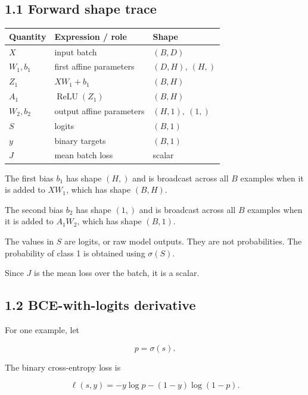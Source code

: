 \documentclass[11pt]{article}
\begin{document}
\subsection*{1.1 Forward shape trace}
\begin{center}

  \begin{tabular}{lll}
    \toprule
    Quantity & Expression / role & Shape \\
    \midrule
    $X$ & input batch & $(B,D)$ \\
    $W_1,b_1$ & first affine parameters & $(D,H),\ (H,)$ \\
    $Z_1$ & $XW_1+b_1$ & $(B,H)$ \\
    $A_1$ & $\operatorname{ReLU}(Z_1)$ & $(B,H)$ \\
    $W_2,b_2$ & output affine parameters & $(H,1),\ (1,)$ \\
    $S$ & logits & $(B,1)$ \\
    $y$ & binary targets & $(B,1)$ \\
    $J$ & mean batch loss & scalar \\
    \bottomrule
  \end{tabular}
\end{center}

The first bias $b_1$ has shape $(H,)$ and is broadcast across all
$B$ examples when it is added to $XW_1$, which has shape $(B,H)$.

The second bias $b_2$ has shape $(1,)$ and is broadcast across all
$B$ examples when it is added to $A_1W_2$, which has shape $(B,1)$.

The values in $S$ are logits, or raw model outputs. They are not
probabilities. The probability of class 1 is obtained using
$\sigma(S)$.

Since $J$ is the mean loss over the batch, it is a scalar.


\subsection*{1.2 BCE-with-logits derivative}
For one example, let

        \[
          p = \sigma(s).
        \]

The binary cross-entropy loss is

        \[
          \ell(s,y)
          =
          -y\log p
          -
          (1-y)\log(1-p).
        \]
\end{document}
